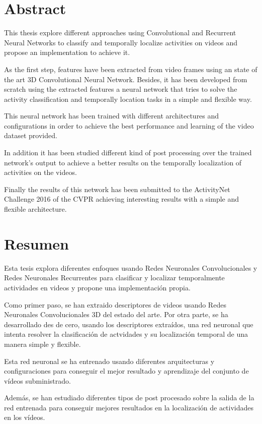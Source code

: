 \chapter*{Abstract}

This thesis explore different approaches using Convolutional and Recurrent Neural Networks to classify and temporally localize activities on videos and propose an implementation to achieve it.

As the first step, features have been extracted from video frames using an state of the art 3D Convolutional Neural Network. Besides, it has been developed from scratch using the extracted features a neural network that tries to solve the activity classification and temporally location tasks in a simple and flexible way.

This neural network has been trained with different architectures and configurations in order to achieve the best performance and learning of the video dataset provided.

In addition it has been studied different kind of post processing over the trained network's output to achieve a better results on the temporally localization of activities on the videos.

Finally the results of this network has been submitted to the ActivityNet Challenge 2016 of the CVPR achieving interesting results with a simple and flexible architecture.

\chapter*{Resumen}

Esta tesis explora diferentes enfoques usando Redes Neuronales Convolucionales y Redes Neuronales Recurrentes para clasificar y localizar temporalmente actividades en videos y propone una implementación propia.

Como primer paso, se han extraido descriptores de videos usando Redes Neuronales Convolucionales 3D del estado del arte. Por otra parte, se ha desarrollado des de cero, usando los descriptores extraídos, una red neuronal que intenta resolver la clasificación de actvidades y su localización temporal de una manera simple y flexible.

Esta red neuronal se ha entrenado usando diferentes arquitecturas y configuraciones para conseguir el mejor resultado y aprendizaje del conjunto de vídeos subministrado. 

Además, se han estudiado diferentes tipos de post procesado sobre la salida de la red entrenada para conseguir mejores resultados en la localización de actividades en los vídeos.

